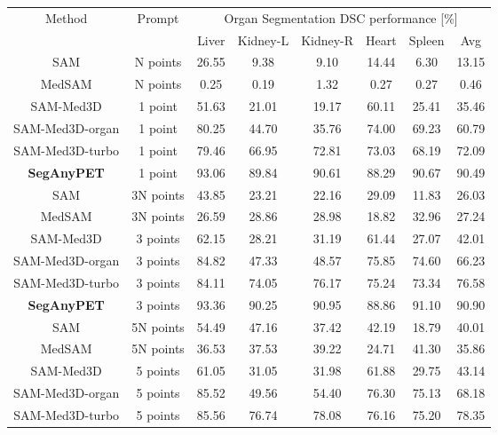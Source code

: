 \begin{table*}[t]
	\centering
    \normalsize
    \setlength\tabcolsep{10pt}
	\renewcommand\arraystretch{1.15}
	\begin{tabular}{c|c|ccccc|c}
		\hline 	\hline
		\multirow{2}{*}{Method}  &  \multirow{2}{*}{Prompt} & \multicolumn{6}{c}{Organ Segmentation DSC performance [\%]}  \\
\cline{3-8}  &&  Liver & Kidney-L & Kidney-R & Heart & Spleen & Avg  \\ \hline
SAM  \cite{SAM} & N points & 26.55 & 9.38 & 9.10 & 14.44 & 6.30 & 13.15 \\
MedSAM  \cite{MedSAM} & N points & 0.25 & 0.19 & 1.32 & 0.27 & 0.27 & 0.46 \\
SAM-Med3D \cite{SAM-Med3D} & 1 point & 51.63 & 21.01 & 19.17 & 60.11 & 25.41 & 35.46 \\
SAM-Med3D-organ & 1 point & 80.25 & 44.70 & 35.76 & 74.00 & 69.23 & 60.79 \\ 
SAM-Med3D-turbo & 1 point & 79.46 & 66.95 & 72.81 & 73.03 & 68.19 & 72.09 \\ \hline
\rowcolor{gray!25} \textbf{SegAnyPET}  & 1 point & 93.06 & 89.84 & 90.61 & 88.29 & 90.67 & 90.49 \\ \hline
SAM  \cite{SAM} & 3N points & 43.85 & 23.21 & 22.16 & 29.09 & 11.83 & 26.03  \\
MedSAM  \cite{MedSAM} & 3N points & 26.59 & 28.86 & 28.98 & 18.82 & 32.96 & 27.24 \\
SAM-Med3D \cite{SAM-Med3D} & 3 points & 62.15 & 28.21 & 31.19 & 61.44 & 27.07 & 42.01 \\
SAM-Med3D-organ & 3 points & 84.82 & 47.33 & 48.57 & 75.85 & 74.60 & 66.23 \\
SAM-Med3D-turbo & 3 points & 84.11 & 74.05 & 76.17 & 75.24 & 73.34 & 76.58 \\ \hline
\rowcolor{gray!25} \textbf{SegAnyPET}  & 3 points & 93.36 & 90.25 & 90.95 & 88.86 & 91.10 & 90.90 \\ \hline
SAM  \cite{SAM} & 5N points & 54.49 & 47.16 & 37.42 & 42.19 & 18.79 & 40.01 \\
MedSAM  \cite{MedSAM} & 5N points & 36.53 & 37.53 & 39.22 & 24.71 & 41.30 & 35.86 \\
SAM-Med3D \cite{SAM-Med3D} & 5 points & 61.05 & 31.05 & 31.98 & 61.88 & 29.75 & 43.14 \\
SAM-Med3D-organ & 5 points & 85.52 & 49.56 & 54.40 & 76.30 & 75.13 & 68.18 \\
SAM-Med3D-turbo & 5 points & 85.56 & 76.74 & 78.08 & 76.16 & 75.20 & 78.35 \\ \hline

\end{tabular}
\end{table*}
